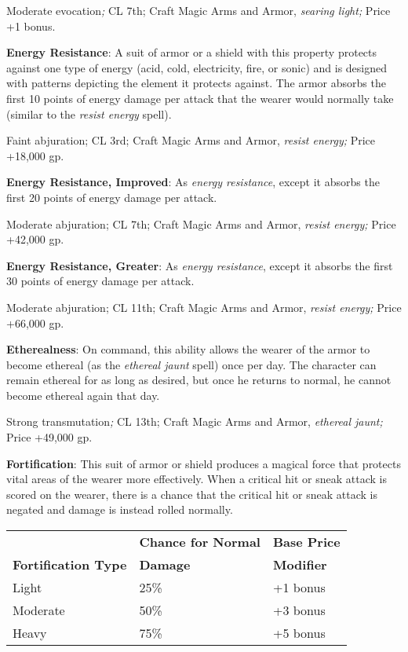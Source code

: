 Moderate evocation\textit{; }CL 7th; Craft Magic Arms and Armor, \textit{searing light; }Price +1 bonus.
				
\textbf{Energy Resistance}: A suit of armor or a shield with this property protects against one type of energy (acid, cold, electricity, fire, or sonic) and is designed with patterns depicting the element it protects against. The armor absorbs the first 10 points of energy damage per attack that the wearer would normally take (similar to the \textit{resist energy }spell).
				
Faint abjuration; CL 3rd; Craft Magic Arms and Armor, \textit{resist energy; }Price +18,000 gp.
				
\textbf{Energy Resistance, Improved}: As \textit{energy resistance}, except it absorbs the first 20 points of energy damage per attack.
				
Moderate abjuration; CL 7th; Craft Magic Arms and Armor, \textit{resist energy; }Price +42,000 gp.
				
\textbf{Energy Resistance, Greater}: As \textit{energy resistance}, except it absorbs the first 30 points of energy damage per attack.
				
Moderate abjuration; CL 11th; Craft Magic Arms and Armor, \textit{resist energy; }Price +66,000 gp.
				
\textbf{Etherealness}: On command, this ability allows the wearer of the armor to become ethereal (as the \textit{ethereal jaunt }spell) once per day. The character can remain ethereal for as long as desired, but once he returns to normal, he cannot become ethereal again that day.
				
Strong transmutation\textit{; }CL 13th; Craft Magic Arms and Armor, \textit{ethereal jaunt; }Price +49,000 gp.
				
\textbf{Fortification}: This suit of armor or shield produces a magical force that protects vital areas of the wearer more effectively. When a critical hit or sneak attack is scored on the wearer, there is a chance that the critical hit or sneak attack is negated and damage is instead rolled normally.

\begin{tabular}{lll}
 &                 \textbf{Chance for Normal} & \textbf{Base Price}\\
\textbf{Fortification Type} & \textbf{Damage} & \textbf{Modifier} \\
Light    &25\%     &+1 bonus \\
Moderate &50\%  &+3 bonus \\
Heavy    &75\%     &+5 bonus  \\
\end{tabular}




